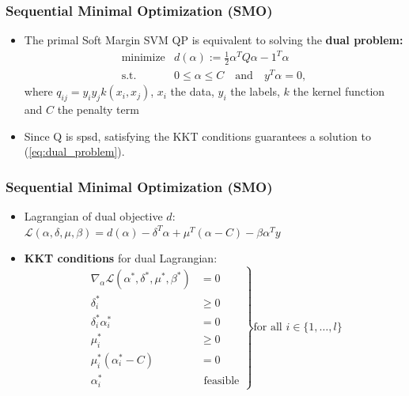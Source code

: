 \documentclass[12pt, compress]{beamer}
\newcommand{\titleC}{Sequential Minimal Optimization (SMO)}
\begin{document}
\begin{frame}
  \frametitle{\titleC}
  \begin{itemize}
  	\item The primal Soft Margin SVM QP is equivalent to solving the \textbf{\alert{dual problem:}}
  	\begin{eqnarray}\label{eq:dual_problem}
  	\text{minimize} & d(\alpha) := \frac{1}{2} \alpha^T Q \alpha - 1^T \alpha  \\ 
  	\nonumber
  	\text{s.t.} &  0 \leq \alpha \leq C  \quad \text{and} \quad 	y^T \alpha = 0,
  	\end{eqnarray}
  	where $q_{ij} = y_i y_j k(x_i,x_j)$, $x_i$ the data, $y_i$ the labels, $k$ the kernel function and $C$ the penalty term
  	\item Since Q is spsd, satisfying the KKT conditions guarantees a solution to (\ref{eq:dual_problem}).
  \end{itemize}
\end{frame}

\begin{frame}
\frametitle{\titleC}
\begin{itemize}
	
	\item Lagrangian of dual objective $d$: $\mathcal{L}(\alpha,\delta,\mu,\beta) = d(\alpha) - \delta^T\alpha + \mu^T(\alpha - C) - \beta \alpha^T y$
	\item \textbf{\alert{KKT conditions}} for dual Lagrangian:
	\begin{equation*}
	\left.
	\begin{aligned}
	\nabla_{\alpha} \mathcal{L}(\alpha^*,\delta^*,\mu^*,\beta^*) &= 0\\
	\delta_i^* &\geq 0\\
	\delta_i^* \alpha_i^* &= 0\\
	\mu_i^* &\geq 0\\
	\mu_i^* (\alpha_i^*-C) &= 0\\
	\alpha_i^* &\text{ feasible}
	\end{aligned}
	\right\} \text{for all } i \in \{1,\ldots,l\}
	\end{equation*}
	
\end{itemize}
\end{frame}
\end{document}
